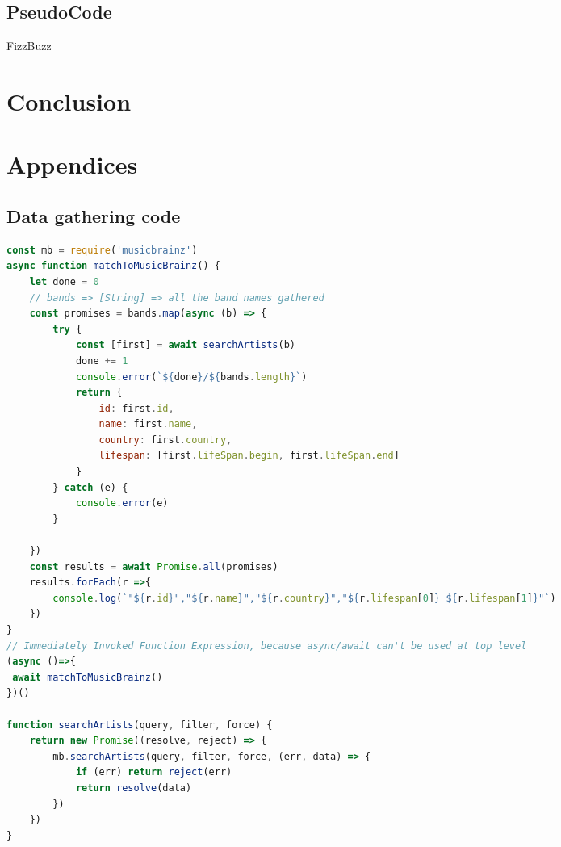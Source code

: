 \documentclass[10pt, a4paper]{article}
\begin{document}
\subsection{PseudoCode}

\begin{algorithm}[h]
\caption{FizzBuzz}
\end{algorithm}
	
\section{Conclusion}	


\section{Appendices}
\subsection{Data gathering code}

\begin{lstlisting}[language=JavaScript, label=lst:artistLookup, caption = Artist name to MusicBrainzID lookup ]
const mb = require('musicbrainz')
async function matchToMusicBrainz() {
    let done = 0
    // bands => [String] => all the band names gathered
    const promises = bands.map(async (b) => {
        try {
            const [first] = await searchArtists(b)
            done += 1
            console.error(`${done}/${bands.length}`)
            return {
                id: first.id,
                name: first.name,
                country: first.country,
                lifespan: [first.lifeSpan.begin, first.lifeSpan.end]
            }
        } catch (e) {
            console.error(e)
        }

    })
    const results = await Promise.all(promises)
    results.forEach(r =>{
        console.log(`"${r.id}","${r.name}","${r.country}","${r.lifespan[0]} ${r.lifespan[1]}"`)
    })
}
// Immediately Invoked Function Expression, because async/await can't be used at top level
(async ()=>{
 await matchToMusicBrainz()
})()

function searchArtists(query, filter, force) {
    return new Promise((resolve, reject) => {
        mb.searchArtists(query, filter, force, (err, data) => {
            if (err) return reject(err)
            return resolve(data)
        })
    })
}
\end{lstlisting}
\end{document}
